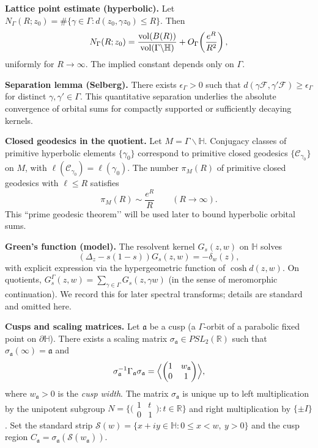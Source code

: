 \medskip

\noindent\textbf{Lattice point estimate (hyperbolic).}
Let $N_{\Gamma}(R;z_{0})=\#\{\gamma\in\Gamma: d(z_{0},\gamma z_{0})\le R\}$.
Then
\[
  N_{\Gamma}(R;z_{0})=\frac{\operatorname{vol}(B(R))}{\operatorname{vol}(\Gamma\backslash\mathbb{H})}+O_{\Gamma}\!\left(\frac{e^{R}}{R^{2}}\right),
\]
uniformly for $R\to\infty$. The implied constant depends only on $\Gamma$.

\medskip

\noindent\textbf{Separation lemma (Selberg).}
There exists $\epsilon_{\Gamma}>0$ such that
$d(\gamma\mathcal{F},\gamma'\mathcal{F})\ge \epsilon_{\Gamma}$ for distinct $\gamma,\gamma'\in\Gamma$.
This quantitative separation underlies the absolute convergence of orbital sums
for compactly supported or sufficiently decaying kernels.

\medskip

\noindent\textbf{Closed geodesics in the quotient.}
Let $M=\Gamma\backslash\mathbb{H}$. Conjugacy classes of primitive hyperbolic elements
$\{\gamma_{0}\}$ correspond to primitive closed geodesics $\{\mathcal{C}_{\gamma_{0}}\}$ on $M$,
with $\ell(\mathcal{C}_{\gamma_{0}})=\ell(\gamma_{0})$.
The number $\pi_{M}(R)$ of primitive closed geodesics with $\ell\le R$ satisfies
\[
  \pi_{M}(R)\sim \frac{e^{R}}{R}\qquad (R\to\infty).
\]
This “prime geodesic theorem’’ will be used later to bound hyperbolic orbital sums.

\medskip

\noindent\textbf{Green’s function (model).}
The resolvent kernel $G_{s}(z,w)$ on $\mathbb{H}$ solves
\[
  (\Delta_{z}-s(1-s))G_{s}(z,w)=-\delta_{w}(z),
\]
with explicit expression via the hypergeometric function of $\cosh d(z,w)$. On quotients,
$G_{s}^{\Gamma}(z,w)=\sum_{\gamma\in\Gamma} G_{s}(z,\gamma w)$ (in the sense of meromorphic continuation).
We record this for later spectral transforms; details are standard and omitted here.


\noindent\textbf{Cusps and scaling matrices.}
Let $\mathfrak{a}$ be a cusp (a $\Gamma$-orbit of a parabolic fixed point on $\partial\mathbb{H}$).
There exists a scaling matrix $\sigma_{\mathfrak{a}}\in PSL_{2}(\mathbb{R})$ such that
$\sigma_{\mathfrak{a}}(\infty)=\mathfrak{a}$ and
\[
  \sigma_{\mathfrak{a}}^{-1}\Gamma_{\mathfrak{a}}\sigma_{\mathfrak{a}}
  =
  \Bigl\langle
  \begin{pmatrix}1&w_{\mathfrak{a}}\\ 0&1\end{pmatrix}
  \Bigr\rangle,
\]
where $w_{\mathfrak{a}}>0$ is the \emph{cusp width}.
The matrix $\sigma_{\mathfrak{a}}$ is unique up to left multiplication by the unipotent subgroup
$N=\{\bigl(\begin{smallmatrix}1&t\\0&1\end{smallmatrix}\bigr): t\in\mathbb{R}\}$ and right multiplication by $\{\pm I\}$.
Set the standard strip $\mathcal{S}(w)=\{x+iy\in\mathbb{H}: 0\le x<w,\ y>0\}$ and
the cusp region $C_{\mathfrak{a}}=\sigma_{\mathfrak{a}}(\mathcal{S}(w_{\mathfrak{a}}))$.

